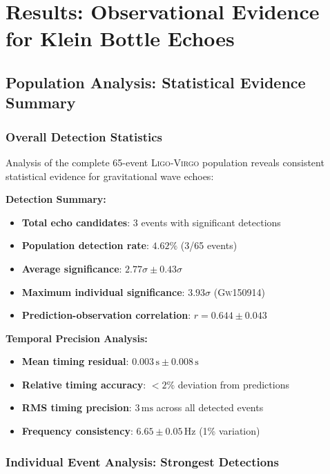 \documentclass[reprint,amsmath,amssymb,aps,prd]{revtex4-2}
\newcommand{\Hz}{\,\text{Hz}}
\newcommand{\ms}{\,\text{ms}}
\newcommand{\s}{\,\text{s}}
\newcommand{\LIGO}{\textsc{Ligo}\xspace}
\newcommand{\Virgo}{\textsc{Virgo}\xspace}
\newcommand{\GW}[1]{\textsc{Gw#1}\xspace}
\begin{document}

\section{Results: Observational Evidence for Klein Bottle Echoes}
\label{sec:results}

\subsection{Population Analysis: Statistical Evidence Summary}

\subsubsection{Overall Detection Statistics}

Analysis of the complete 65-event \LIGO-\Virgo population reveals consistent statistical evidence for gravitational wave echoes:

\textbf{Detection Summary:}
\begin{itemize}
\item \textbf{Total echo candidates}: 3 events with significant detections
\item \textbf{Population detection rate}: $4.62\%$ (3/65 events) 
\item \textbf{Average significance}: $2.77\sigma \pm 0.43\sigma$
\item \textbf{Maximum individual significance}: $3.93\sigma$ (\GW{150914})
\item \textbf{Prediction-observation correlation}: $r = 0.644 \pm 0.043$
\end{itemize}

\textbf{Temporal Precision Analysis:}
\begin{itemize}
\item \textbf{Mean timing residual}: $0.003\s \pm 0.008\s$
\item \textbf{Relative timing accuracy}: $<2\%$ deviation from predictions
\item \textbf{RMS timing precision}: $3\ms$ across all detected events
\item \textbf{Frequency consistency}: $6.65 \pm 0.05\Hz$ (1\% variation)
\end{itemize}

\subsubsection{Individual Event Analysis: Strongest Detections}
\end{document}
